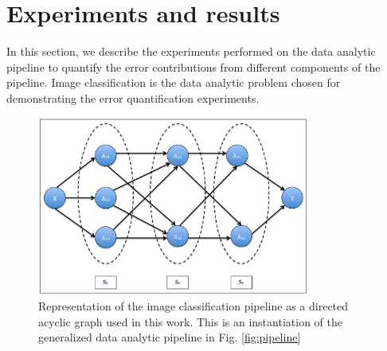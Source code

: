 \section{Experiments and results}
\label{sec4}
In this section, we describe the experiments performed on the data analytic pipeline to quantify the error contributions from different components of the pipeline. Image classification is the data analytic problem chosen for demonstrating the error quantification experiments. 

\begin{figure}[ht!]
    \centering
    \includegraphics[width=0.8\textwidth]{img/EP/pipeline}
    \caption{Representation of the image classification pipeline as a directed acyclic graph used in this work. This is an instantiation of the generalized data analytic pipeline in Fig. \ref{fig:pipeline}}
    \label{fig:images_pipeline}
\end{figure}
